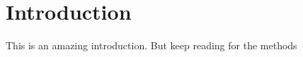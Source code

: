 \maketitle
\section{Introduction}

This is an amazing introduction. But keep reading for the methods